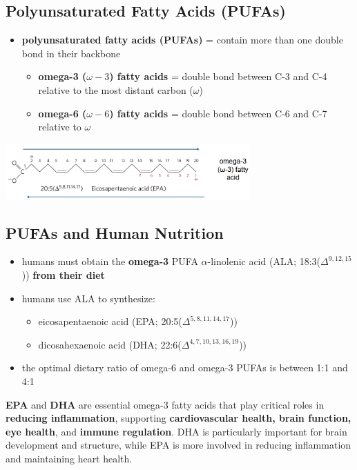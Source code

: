 \documentclass[10pt]{article}
\begin{document}
\subsection*{Polyunsaturated Fatty Acids (PUFAs)}
\begin{itemize}
    \item \textbf{polyunsaturated fatty acids (PUFAs)} = contain more than one double bond in their backbone
    \begin{itemize}
        \item \textbf{omega-3 ($\omega-3$) fatty acids} = double bond between C-3 and C-4 relative to the most distant carbon ($\omega$)
        \item \textbf{omega-6 ($\omega-6$) fatty acids} = double bond between C-6 and C-7 relative to $\omega$
    \end{itemize}
\end{itemize}
\begin{center}
    \includegraphics*[width=0.7\textwidth]{L2_7.png}
\end{center}

\subsection*{PUFAs and Human Nutrition}
\begin{itemize}
    \item humans must obtain the \textbf{omega-3} PUFA $\alpha$-linolenic acid (ALA; 18:3($\Delta^{9, 12, 15}$)) \textbf{from their diet}
    \item humans use ALA to synthesize:
    \begin{itemize}
        \item eicosapentaenoic acid (EPA; 20:5($\Delta^{5, 8, 11, 14, 17}$))
        \item dicosahexaenoic acid (DHA; 22:6($\Delta^{4, 7, 10, 13, 16, 19}$))
    \end{itemize}
    \item the optimal dietary ratio of omega-6 and omega-3 PUFAs is between 1:1 and 4:1
\end{itemize}
\textbf{EPA} and \textbf{DHA} are essential omega-3 fatty acids that play critical roles in \textbf{reducing inflammation}, supporting \textbf{cardiovascular health, brain function, eye health}, and \textbf{immune regulation}.  DHA is particularly important for brain development and structure, while EPA is more involved in reducing inflammation and maintaining heart health.
\end{document}
